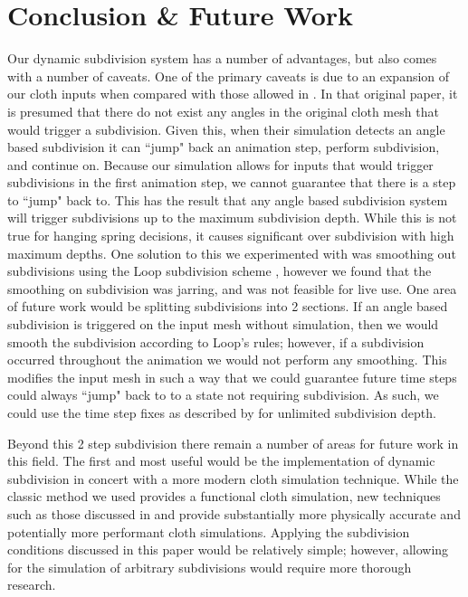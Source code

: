 \documentclass[sigconf]{acmart}
\begin{document}
\section{Conclusion \& Future Work}
Our dynamic subdivision system has a number of advantages, but also comes with a number of caveats. One of the primary caveats is due to an expansion of our cloth inputs when compared with those allowed in \cite{hutchinson}. In that original paper, it is presumed that there do not exist any angles in the original cloth mesh that would trigger a subdivision. Given this, when their simulation detects an angle based subdivision it can ``jump" back an animation step, perform subdivision, and continue on. Because our simulation allows for inputs that would trigger subdivisions in the first animation step, we cannot guarantee that there is a step to ``jump" back to. This has the result that any angle based subdivision system will trigger subdivisions up to the maximum subdivision depth. While this is not true for hanging spring decisions, it causes significant over subdivision with high maximum depths. One solution to this we experimented with was smoothing out subdivisions using the Loop subdivision scheme \cite{loop}, however we found that the smoothing on subdivision was jarring, and was not feasible for live use. One area of future work would be splitting subdivisions into 2 sections. If an angle based subdivision is triggered on the input mesh without simulation, then we would smooth the subdivision according to Loop's rules; however, if a subdivision occurred throughout the animation we would not perform any smoothing. This modifies the input mesh in such a way that we could guarantee future time steps could always ``jump" back to to a state not requiring subdivision. As such, we could use the time step fixes as described by \cite{hutchinson} for unlimited subdivision depth.

Beyond this 2 step subdivision there remain a number of areas for future work in this field. The first and most useful would be the implementation of dynamic subdivision in concert with a more modern cloth simulation technique. While the classic method we used \cite{provot} provides a functional cloth simulation, new techniques such as those discussed in \cite{largesteps} and \cite{collisions} provide substantially more physically accurate and potentially more performant cloth simulations. Applying the subdivision conditions discussed in this paper would be relatively simple; however, allowing for the simulation of arbitrary subdivisions would require more thorough research.
\end{document}
